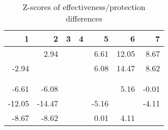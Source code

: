 \begin{table}[ht]
\centering
\begin{tabular}{rrrrrrr}
  \hline
1 & 2 & 3 & 4 & 5 & 6 & 7 \\ 
  \hline
 & 2.94 &  &  & 6.61 & 12.05 & 8.67 \\ 
  -2.94 &  &  &  & 6.08 & 14.47 & 8.62 \\ 
   &  &  &  &  &  &  \\ 
   &  &  &  &  &  &  \\ 
  -6.61 & -6.08 &  &  &  & 5.16 & -0.01 \\ 
  -12.05 & -14.47 &  &  & -5.16 &  & -4.11 \\ 
  -8.67 & -8.62 &  &  & 0.01 & 4.11 &  \\ 
   \hline
\end{tabular}
\caption{Z-scores of effectiveness/protection differences} 
\end{table}
